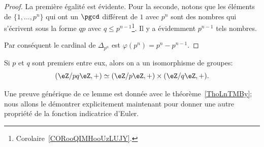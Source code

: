 \begin{proof}
    La première égalité est évidente. Pour la seconde, notons que les éléments de \( \{ 1,\ldots,p^n \}\) qui ont un \( \pgcd\) différent de \( 1\) avec \( p^n\) sont des nombres qui s'écrivent sous la forme \( qp\) avec \( q\leq p^{n-1}\)\footnote{Corolaire~\ref{CORooQIMHooUzLUJY}.}. Il y a évidemment \( p^{n-1}\) tels nombres.

    Par conséquent le cardinal de \( \Delta_{p^n}\) est \( \varphi(p^{n})=p^n-p^{n-1}\).
\end{proof}

\begin{lemma}  \label{LEM_chinoisZ2}
  Si \( p \) et \( q \) sont premiers entre eux, alors on a un isomorphisme de groupes:
   \begin{equation}\label{EQ_chinoisZ2}
        (\eZ/pq\eZ,+)\simeq(\eZ/p\eZ,+)\times(\eZ/q\eZ,+).
   \end{equation}
\end{lemma}
Une preuve générique de ce lemme est donnée avec le théorème~\ref{ThoLnTMBy}; nous allons le démontrer explicitement maintenant pour donner une autre propriété de la fonction indicatrice d'Euler.


